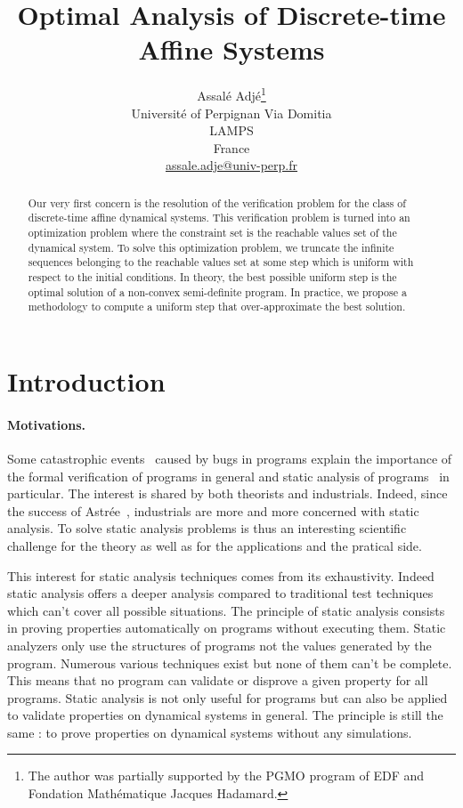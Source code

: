 \documentclass[10pt]{article}
\title{Optimal Analysis of Discrete-time Affine Systems}
\author{Assalé Adjé\footnote{The author was partially supported by the PGMO program of EDF and Fondation Math\'{e}matique Jacques Hadamard. }\\
Université of Perpignan Via Domitia\\
LAMPS\\
France\\
\url{assale.adje@univ-perp.fr}
}
\date{}%
\begin{document}
\maketitle
\begin{abstract}
 Our very first concern is the resolution of the verification problem for the class of discrete-time affine dynamical systems. This verification problem is turned into an optimization problem where the constraint set is the reachable values set of the dynamical system. To solve this optimization problem, we truncate the infinite sequences belonging to the reachable values set at some step which is uniform with respect to the initial conditions. In theory, the best possible uniform step is the optimal solution of a non-convex semi-definite program. In practice,  we propose a methodology to compute a uniform step that over-approximate the best solution.
\end{abstract}

\section{Introduction}
\paragraph{Motivations.}
Some catastrophic events~\cite{johnson2005natural,mcquaid2012software} caused by bugs in programs explain the importance of the formal verification of programs in general and static analysis of programs~\cite{cousot2010gentle} in particular. The interest is shared by both theorists and industrials. Indeed, since the success of Astrée~\cite{delmas2007astree,souyris2007experimental,bouissou2009space}, industrials are  more and more concerned with static analysis.  To solve static analysis problems is thus an interesting scientific challenge for the theory as well as for the applications and the pratical  side.   

This interest for static analysis techniques comes from its exhaustivity. Indeed static analysis offers a deeper analysis compared to traditional test techniques which can't cover all possible situations. The principle of static analysis consists in proving properties automatically on programs without executing them. Static analyzers only use the structures of programs not the values generated by the program.  Numerous various techniques exist but none of them can't be complete. This means that no program can validate or disprove a given property for all programs. Static analysis is not only useful for programs but can also be applied to validate properties on dynamical systems in general. The principle is still the same : to prove properties on dynamical systems without any simulations.
\end{document}
